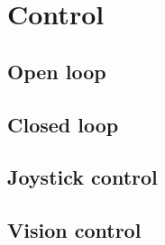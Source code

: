 \section{Control}\insertloftspace
\setcounter{figure}{0}\setcounter{table}{0}

\subsection{Open loop}

\subsection{Closed loop}

\subsection{Joystick control}

\subsection{Vision control}
